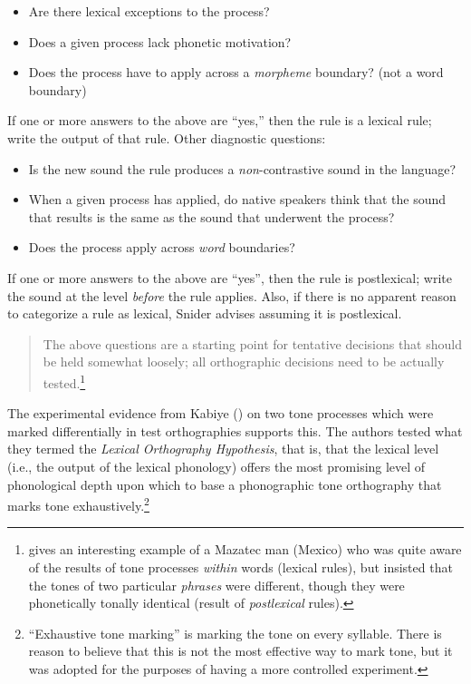 \documentclass[output=paper]{langscibook}
\begin{document}
\begin{itemize}
    \item Are there lexical exceptions to the process? 
    \item Does a given process lack phonetic motivation?
    \item Does the process have to apply across a \textit{morpheme} boundary? (not a word boundary)
\end{itemize}

If one or more answers to the above are “yes,” then the rule is a lexical rule; write the output of that rule. Other diagnostic questions:

\begin{itemize}
    \item Is the new sound the rule produces a \textit{non}{}-contrastive sound in the language? 
    \item When a given process has applied, do native speakers think that the sound that results is the same as the sound that underwent the process?
    \item Does the process apply across \textit{word} boundaries? 
\end{itemize}

If one or more answers to the above are “yes”, then the rule is postlexical; write the sound at the level \textit{before} the rule applies. Also, if there is no apparent reason to categorize a rule as lexical, Snider advises assuming it is postlexical.

    \begin{quote}
      The above questions are a starting point for tentative decisions that should be held somewhat loosely; all orthographic decisions need to be actually tested.\footnote{\citet[342--343]{Gudschinsky1958} gives an interesting example of a Mazatec man (Mexico) who was quite aware of the results of tone processes \textit{within} words (lexical rules), but insisted that the tones of two particular \textit{phrases} were different, though they were phonetically tonally identical (result of \textit{postlexical} rules).}
    \end{quote}
    
The experimental evidence from Kabiye (\citealt{Roberts2016neither}) on two tone processes which were marked differentially in test orthographies supports this. The authors tested what they termed the \textit{Lexical Orthography Hypothesis}, that is, that the lexical level (i.e., the output of the lexical phonology) offers the most promising level of phonological depth upon which to base a phonographic tone orthography that marks tone exhaustively.\footnote{“Exhaustive tone marking” is marking the tone on every syllable. There is reason to believe that this is not the most effective way to mark tone, but it was adopted for the purposes of having a more controlled experiment.}
\end{document}
